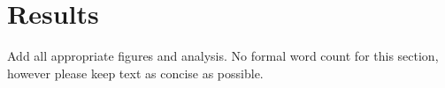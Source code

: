 \section{Results}
\label{sec:results}
Add all appropriate figures and analysis.
No formal word count for this section, however
please keep text as concise as possible.